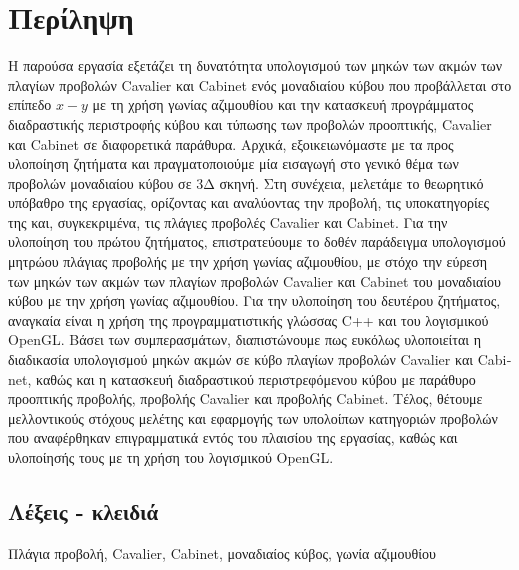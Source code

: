 
\chapter*{Περίληψη}

Η παρούσα εργασία εξετάζει τη δυνατότητα υπολογισμού των μηκών των ακμών των πλαγίων προβολών \textlatin{Cavalier} και \textlatin{Cabinet} ενός μοναδιαίου κύβου που προβάλλεται στο επίπεδο $x-y$ με τη χρήση γωνίας αζιμουθίου και την κατασκευή προγράμματος διαδραστικής περιστροφής κύβου και τύπωσης των προβολών  προοπτικής, \textlatin{Cavalier} και \textlatin{Cabinet} σε διαφορετικά παράθυρα. Αρχικά, εξοικειωνόμαστε με τα προς υλοποίηση ζητήματα και πραγματοποιούμε μία εισαγωγή στο γενικό θέμα των προβολών μοναδιαίου κύβου σε 3Δ σκηνή. Στη συνέχεια, μελετάμε το θεωρητικό υπόβαθρο της εργασίας, ορίζοντας και αναλύοντας την προβολή, τις υποκατηγορίες της και, συγκεκριμένα, τις πλάγιες προβολές \textlatin{Cavalier} και \textlatin{Cabinet}. Για την υλοποίηση του πρώτου ζητήματος, επιστρατεύουμε το δοθέν παράδειγμα υπολογισμού μητρώου πλάγιας προβολής με την χρήση γωνίας αζιμουθίου, με στόχο την εύρεση των μηκών των ακμών των πλαγίων προβολών \textlatin{Cavalier} και \textlatin{Cabinet} του μοναδιαίου κύβου με την χρήση γωνίας αζιμουθίου. Για την υλοποίηση του δευτέρου ζητήματος, αναγκαία είναι η χρήση της προγραμματιστικής γλώσσας \textlatin{C++} και του λογισμικού \textlatin{OpenGL}. Βάσει των συμπερασμάτων, διαπιστώνουμε πως ευκόλως υλοποιείται η διαδικασία υπολογισμού μηκών ακμών σε κύβο πλαγίων προβολών \textlatin{Cavalier} και \textlatin{Cabinet}, καθώς και η κατασκευή διαδραστικού περιστρεφόμενου κύβου με παράθυρο προοπτικής προβολής, προβολής \textlatin{Cavalier} και προβολής \textlatin{Cabinet}. Τέλος, θέτουμε μελλοντικούς στόχους μελέτης και εφαρμογής των υπολοίπων κατηγοριών προβολών που αναφέρθηκαν επιγραμματικά εντός του πλαισίου της εργασίας, καθώς και υλοποίησής τους με τη χρήση του λογισμικού \textlatin{OpenGL}.

\vspace{1.5em}

\section*{Λέξεις - κλειδιά}
Πλάγια προβολή, \textlatin{Cavalier}, \textlatin{Cabinet}, μοναδιαίος κύβος, γωνία αζιμουθίου 


